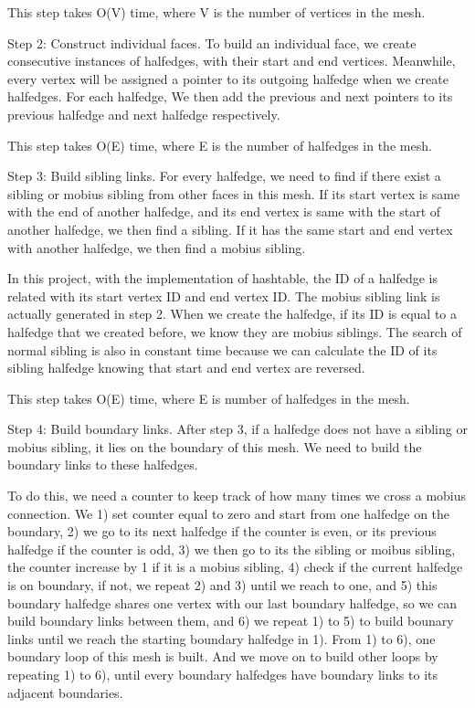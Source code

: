 \documentclass[12pt]{article}
\begin{document}
This step takes O(V) time, where V is the number of vertices in the mesh.

Step 2: Construct individual faces. To build an individual face, we create consecutive instances of halfedges, with their start and end vertices. Meanwhile, every vertex will be assigned a pointer to its outgoing halfedge when we create halfedges. For each halfedge, We then add the previous and next pointers to its previous halfedge and next halfedge respectively. 

This step takes O(E) time, where E is the number of halfedges in the mesh.

Step 3: Build sibling links. For every halfedge, we need to find if there exist a sibling or mobius sibling from other faces in this mesh. If its start vertex is same with the end of another halfedge, and its end vertex is same with the start of another halfedge, we then find a sibling. If it has the same start and end vertex with another halfedge, we then find a mobius sibling. 

In this project, with the implementation of hashtable, the ID of a halfedge is related with its start vertex ID and end vertex ID. The mobius sibling link is actually generated in step 2. When we create the halfedge, if its ID is equal to a halfedge that we created before, we know they are mobius siblings. The search of normal sibling is also in constant time because we can calculate the ID of its sibling halfedge knowing that start and end vertex are reversed. 

This step takes O(E) time, where E is number of halfedges in the mesh.

Step 4: Build boundary links. After step 3, if a halfedge does not have a sibling or mobius sibling, it lies on the boundary of this mesh. We need to build the boundary links to these halfedges.

To do this, we need a counter to keep track of how many times we cross a mobius connection. We 1) set counter equal to zero and start from one halfedge on the boundary, 2) we go to its next halfedge if the counter is even, or its previous halfedge if the counter is odd, 3) we then go to its the sibling or moibus sibling, the counter increase by 1 if it is a mobius sibling, 4) check if the current halfedge is on boundary, if not, we repeat 2) and 3) until we reach to one, and 5) this boundary halfedge shares one vertex with our last boundary halfedge, so we can build boundary links between them, and 6) we repeat 1) to 5) to build bounary links until we reach the starting boundary halfedge in 1). From 1) to 6), one boundary loop of this mesh is built. And we move on to build other loops by repeating 1) to 6), until every boundary halfedges have boundary links to its adjacent boundaries.
\end{document}
